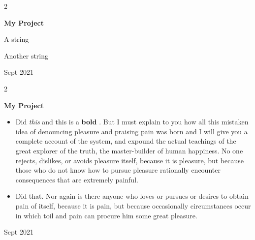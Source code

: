 \documentclass[10pt, letterpaper]{article}
\newenvironment{summary}{
    \begin{description}[
        topsep=0.10 cm,
        parsep=0.10 cm,
        partopsep=0pt,
        itemsep=0pt,
        leftmargin=0.4 cm + 10pt
    ]
}{
    \end{description}
} %
\newenvironment{highlights}{
    \begin{itemize}[
        topsep=0.10 cm,
        parsep=0.10 cm,
        partopsep=0pt,
        itemsep=0pt,
        leftmargin=0.4 cm + 10pt
    ]
}{
    \end{itemize}
} %
\newenvironment{twocolentry}[2][]{
    \onecolentry
    \def\secondColumn{#2}
    \setcolumnwidth{\fill, 4.5 cm}
    \begin{paracol}{2}
}{
    \switchcolumn \raggedleft \secondColumn
    \end{paracol}
    \endonecolentry
} %
\let\hrefWithoutArrow\href
\renewcommand{\href}[2]{\hrefWithoutArrow{#1}{\ifthenelse{\equal{#2}{}}{ }{#2 }\raisebox{.15ex}{\footnotesize \faExternalLink*}}}
\begin{document}
        \vspace{0.2 cm}

        \begin{twocolentry}{
            Sept 2021
        }
            \textbf{My Project}
            \begin{summary}
                \item A string
                \item Another string
            \end{summary}
        \end{twocolentry}


        \vspace{0.2 cm}

        \begin{twocolentry}{
            Sept 2021
        }
            \textbf{My Project}
            \begin{highlights}
                \item Did \textit{this} and this is a \textbf{bold} \href{https://example.com}{link}. But I must explain to you how all this mistaken idea of denouncing pleasure and praising pain was born and I will give you a complete account of the system, and expound the actual teachings of the great explorer of the truth, the master-builder of human happiness. No one rejects, dislikes, or avoids pleasure itself, because it is pleasure, but because those who do not know how to pursue pleasure rationally encounter consequences that are extremely painful.
                \item Did that. Nor again is there anyone who loves or pursues or desires to obtain pain of itself, because it is pain, but because occasionally circumstances occur in which toil and pain can procure him some great pleasure.
            \end{highlights}
        \end{twocolentry}


        \vspace{0.2 cm}
\end{document}

